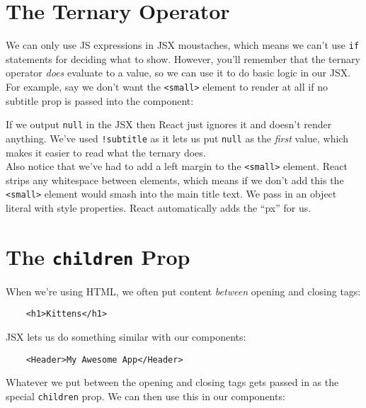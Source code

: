 \section{The Ternary Operator}

We can only use JS expressions in JSX moustaches, which means we can't use \texttt{if} statements for deciding what to show. However, you'll remember that the ternary operator \textit{does} evaluate to a value, so we can use it to do basic logic in our JSX.
\\

For example, say we don't want the \texttt{<small>} element to render at all if no subtitle prop is passed into the component:


If we output \texttt{null} in the JSX then React just ignores it and doesn't render anything. We've used \texttt{!subtitle} as it lets us put \texttt{null} as the \textit{first} value, which makes it easier to read what the ternary does.
\\

Also notice that we've had to add a left margin to the \texttt{<small>} element. React strips any whitespace between elements, which means if we don't add this the \texttt{<small>} element would smash into the main title text. We pass in an object literal with style properties. React automatically adds the ``px'' for us.




\section{The \texttt{children} Prop}

When we're using HTML, we often put content \textit{between} opening and closing tags:

\begin{verbatim}
    <h1>Kittens</h1>
\end{verbatim}

JSX lets us do something similar with our components:

\begin{verbatim}
    <Header>My Awesome App</Header>
\end{verbatim}

Whatever we put between the opening and closing tags gets passed in as the special \texttt{children} prop. We can then use this in our components:


